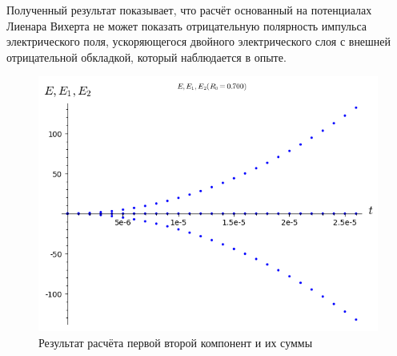 \documentclass[12pt]{article}
\begin{document}
Полученный результат показывает, что расчёт основанный на потенциалах Лиенара Вихерта не может показать отрицательную полярность импульса электрического поля, ускоряющегося двойного электрического слоя с внешней отрицательной обкладкой, который наблюдается в опыте.

\begin{figure}
    \centering
    \includegraphics[scale=0.3]{spherical_explosion_E_E1_E2_t_R0=0_700}
    \caption{Результат расчёта первой второй компонент и их суммы}
    \label{fig:spherical_explosion_E_E1_E2_t_R0=0_700}
\end{figure}


 
 


 
\end{document}
